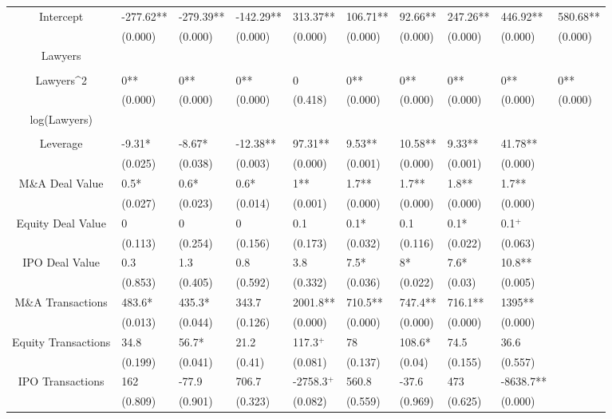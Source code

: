 \documentclass{article}
\begin{document}
\begin{table}[H]
\begin{tabular}{|clllllllll|}
Intercept & -277.62** & -279.39** & -142.29** & 313.37** & 106.71** & 92.66** & 247.26** & 446.92** & 580.68** \\
   & (0.000) & (0.000) & (0.000) & (0.000) & (0.000) & (0.000) & (0.000) & (0.000) & (0.000) \\
  Lawyers &  &  &  &  &  &  &  &  &  \\
   &  &  &  &  &  &  &  &  &  \\
  Lawyers^2 & 0** & 0** & 0** & 0 & 0** & 0** & 0** & 0** & 0** \\
   & (0.000) & (0.000) & (0.000) & (0.418) & (0.000) & (0.000) & (0.000) & (0.000) & (0.000) \\
  log(Lawyers) &  &  &  &  &  &  &  &  &  \\
   &  &  &  &  &  &  &  &  &  \\
  Leverage & -9.31* & -8.67* & -12.38** & 97.31** & 9.53** & 10.58** & 9.33** & 41.78** &  \\
   & (0.025) & (0.038) & (0.003) & (0.000) & (0.001) & (0.000) & (0.001) & (0.000) &  \\
  M\&A Deal Value & 0.5* & 0.6* & 0.6* & 1** & 1.7** & 1.7** & 1.8** & 1.7** &  \\
   & (0.027) & (0.023) & (0.014) & (0.001) & (0.000) & (0.000) & (0.000) & (0.000) &  \\
  Equity Deal Value & 0 & 0 & 0 & 0.1 & 0.1* & 0.1 & 0.1* & 0.1$^{+}$ &  \\
   & (0.113) & (0.254) & (0.156) & (0.173) & (0.032) & (0.116) & (0.022) & (0.063) &  \\
  IPO Deal Value & 0.3 & 1.3 & 0.8 & 3.8 & 7.5* & 8* & 7.6* & 10.8** &  \\
   & (0.853) & (0.405) & (0.592) & (0.332) & (0.036) & (0.022) & (0.03) & (0.005) &  \\
  M\&A Transactions & 483.6* & 435.3* & 343.7 & 2001.8** & 710.5** & 747.4** & 716.1** & 1395** &  \\
   & (0.013) & (0.044) & (0.126) & (0.000) & (0.000) & (0.000) & (0.000) & (0.000) &  \\
  Equity Transactions & 34.8 & 56.7* & 21.2 & 117.3$^{+}$ & 78 & 108.6* & 74.5 & 36.6 &  \\
   & (0.199) & (0.041) & (0.41) & (0.081) & (0.137) & (0.04) & (0.155) & (0.557) &  \\
  IPO Transactions & 162 & -77.9 & 706.7 & -2758.3$^{+}$ & 560.8 & -37.6 & 473 & -8638.7** &  \\
   & (0.809) & (0.901) & (0.323) & (0.082) & (0.559) & (0.969) & (0.625) & (0.000) &  \\

\end{tabular}
\end{table}
\end{document}
